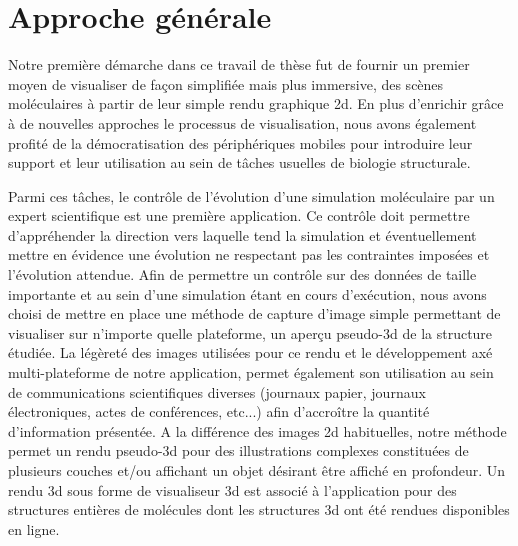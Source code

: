  
\section*{Approche générale}

Notre première démarche dans ce travail de thèse fut de fournir un premier moyen de visualiser de façon simplifiée mais plus immersive, des scènes moléculaires à partir de leur simple rendu graphique 2d. En plus d'enrichir grâce à de nouvelles approches le processus de visualisation, nous avons également profité de la démocratisation des périphériques mobiles pour introduire leur support et leur utilisation au sein de tâches usuelles de biologie structurale.

Parmi ces tâches, le contrôle de l'évolution d'une simulation moléculaire par un expert scientifique est une première application. Ce contrôle doit permettre d'appréhender la direction vers laquelle tend la simulation et éventuellement mettre en évidence une évolution ne respectant pas les contraintes imposées et l'évolution attendue. Afin de permettre un contrôle sur des données de taille importante et au sein d'une simulation étant en cours d’exécution, nous avons choisi de mettre en place une méthode de capture d'image simple permettant de visualiser sur n'importe quelle plateforme, un aperçu pseudo-3d de la structure étudiée. La légèreté des images utilisées pour ce rendu et le développement axé multi-plateforme de notre application, permet également son utilisation au sein de communications scientifiques diverses (journaux papier, journaux électroniques, actes de conférences, etc...) afin d’accroître la quantité d'information présentée. A la différence des images 2d habituelles, notre méthode permet un rendu pseudo-3d pour des illustrations complexes constituées de plusieurs couches et/ou affichant un objet désirant être affiché en profondeur. Un rendu 3d sous forme de visualiseur 3d est associé à l'application pour des structures entières de molécules dont les structures 3d ont été rendues disponibles en ligne.

